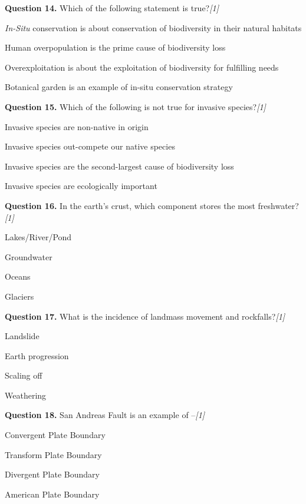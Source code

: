 \documentclass[11pt,a4paper]{article}
\newcommand{\pts}[1]{\hfill \textit{[#1]}}
\begin{document}
\medskip

\noindent \textbf{Question 14.} Which of the following statement is true?\pts{1}
\begin{parts}
  \item \textit{In-Situ} conservation is about conservation of biodiversity in their natural habitats
  \item Human overpopulation is the prime cause of biodiversity loss
  \item Overexploitation is about the exploitation of biodiversity for fulfilling needs
  \item Botanical garden is an example of in-situ conservation strategy
\end{parts}

\medskip

\noindent \textbf{Question 15.} Which of the following is not true for invasive species?\pts{1}
\begin{parts}
  \item Invasive species are non-native in origin
  \item Invasive species out-compete our native species
  \item Invasive species are the second-largest cause of biodiversity loss
  \item Invasive species are ecologically important
\end{parts}

\medskip

\noindent \textbf{Question 16.} In the earth's crust, which component stores the most freshwater?\pts{1}
\begin{parts}
  \item Lakes/River/Pond
  \item Groundwater
  \item Oceans
  \item Glaciers
\end{parts}

\medskip

\noindent \textbf{Question 17.} What is the incidence of landmass movement and rockfalls?\pts{1}
\begin{parts}
  \item Landslide
  \item Earth progression
  \item Scaling off
  \item Weathering
\end{parts}

\medskip

\noindent \textbf{Question 18.} San Andreas Fault is an example of --\pts{1}
\begin{parts}
  \item Convergent Plate Boundary
  \item Transform Plate Boundary
  \item Divergent Plate Boundary
  \item American Plate Boundary
\end{parts}
\end{document}

